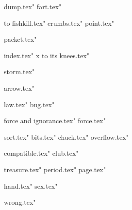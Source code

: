 


 dump.tex"
 fart.tex"



 to fishkill.tex"
 crumbs.tex"
 point.tex"

 packet.tex"

 index.tex"
 x to its knees.tex"

 storm.tex"

 arrow.tex"



 law.tex"
 bug.tex"


 force and ignorance.tex"
 force.tex"




 sort.tex"
 bits.tex"
 chuck.tex"
 overflow.tex"

 compatible.tex"
 club.tex"






 treasure.tex"
 period.tex"
 page.tex"



 hand.tex"
 sex.tex"


 wrong.tex"
